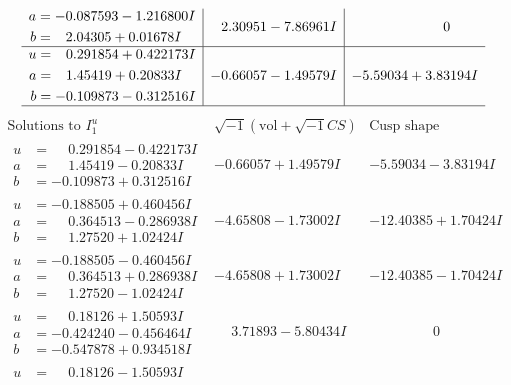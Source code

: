 \documentclass[1p]{elsarticle_modified}
\theoremstyle{definition}
\newcommand{\I}{\sqrt{-1}}
\begin{document}
$$\begin{array}{c|c|c}
\begin{aligned}
a &= -0.087593 - 1.216800 I \\
b &= \phantom{-}2.04305 + 0.01678 I\end{aligned}
 & \phantom{-}2.30951 - 7.86961 I & \phantom{-0.000000 } 0 \\ \hline\begin{aligned}
u &= \phantom{-}0.291854 + 0.422173 I \\
a &= \phantom{-}1.45419 + 0.20833 I \\
b &= -0.109873 - 0.312516 I\end{aligned}
 & -0.66057 - 1.49579 I & -5.59034 + 3.83194 I\\
 \hline 
 \end{array}$$\newpage$$\begin{array}{c|c|c}  
\text{Solutions to }I^u_{1}& \I (\text{vol} + \sqrt{-1}CS) & \text{Cusp shape}\\
 \hline 
\begin{aligned}
u &= \phantom{-}0.291854 - 0.422173 I \\
a &= \phantom{-}1.45419 - 0.20833 I \\
b &= -0.109873 + 0.312516 I\end{aligned}
 & -0.66057 + 1.49579 I & -5.59034 - 3.83194 I \\ \hline\begin{aligned}
u &= -0.188505 + 0.460456 I \\
a &= \phantom{-}0.364513 - 0.286938 I \\
b &= \phantom{-}1.27520 + 1.02424 I\end{aligned}
 & -4.65808 - 1.73002 I & -12.40385 + 1.70424 I \\ \hline\begin{aligned}
u &= -0.188505 - 0.460456 I \\
a &= \phantom{-}0.364513 + 0.286938 I \\
b &= \phantom{-}1.27520 - 1.02424 I\end{aligned}
 & -4.65808 + 1.73002 I & -12.40385 - 1.70424 I \\ \hline\begin{aligned}
u &= \phantom{-}0.18126 + 1.50593 I \\
a &= -0.424240 - 0.456464 I \\
b &= -0.547878 + 0.934518 I\end{aligned}
 & \phantom{-}3.71893 - 5.80434 I & \phantom{-0.000000 } 0 \\ \hline\begin{aligned}
u &= \phantom{-}0.18126 - 1.50593 I \\

\end{aligned}
\end{array}$$
\end{document}
